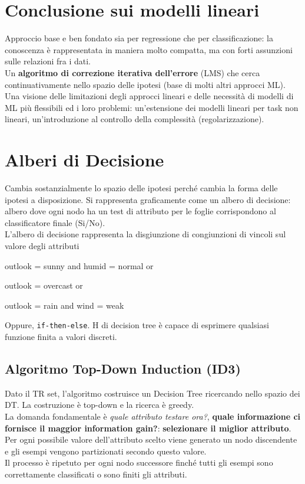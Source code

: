 \documentclass[10pt]{book}
\begin{document}
\section{Conclusione sui modelli lineari}
Approccio base e ben fondato sia per regressione che per classificazione: la conoscenza è rappresentata in maniera molto compatta, ma con forti assunzioni sulle relazioni fra i dati.\\
Un \textbf{algoritmo di correzione iterativa dell'errore} (LMS) che cerca continuativamente nello spazio delle ipotesi (base di molti altri approcci ML).\\
Una visione delle limitazioni degli approcci lineari e delle necessità di modelli di ML più flessibili ed i loro problemi: un'estensione dei modelli lineari per task non lineari, un'introduzione al controllo della complessità (regolarizzazione).
\section{Alberi di Decisione}
Cambia sostanzialmente lo spazio delle ipotesi perché cambia la forma delle ipotesi a disposizione. Si rappresenta graficamente come un albero di decisione: albero dove ogni nodo ha un test di attributo per le foglie corrispondono al classificatore finale (Si/No).\\
L'albero di decisione rappresenta la disgiunzione di congiunzioni di vincoli sul valore degli attributi
\begin{list}{}{}
	\item outlook = sunny and humid = normal or
	\item outlook = overcast or
	\item outlook = rain and wind = weak
\end{list}
Oppure, \texttt{if-then-else}. H di decision tree è capace di esprimere qualsiasi funzione finita a valori discreti.
\subsection{Algoritmo Top-Down Induction (ID3)}
Dato il TR set, l'algoritmo costruisce un Decision Tree ricercando nello spazio dei DT. La costruzione è top-down e la ricerca è greedy.\\
La domanda fondamentale è \textit{quale attributo testare ora?}, \textbf{quale informazione ci fornisce il maggior information gain?}: \textbf{selezionare il miglior attributo}.\\
Per ogni possibile valore dell'attributo scelto viene generato un nodo discendente e gli esempi vengono partizionati secondo questo valore.\\
Il processo è ripetuto per ogni nodo successore finché tutti gli esempi sono correttamente classificati o sono finiti gli attributi.
\end{document}

